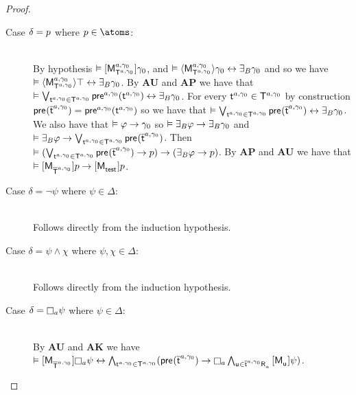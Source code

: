 \begin{proof}
\begin{enumerate}
        \begin{description}
            \item[Case $\delta = \atomP$ where $\atomP \in \atoms$:] \hfill\\
                By hypothesis $\entails \actionA{\aPModel[\agentA, \gamma_0]{\aStatesT[\agentA, \gamma_0]}} \gamma_0$, and $\entails \actionE{\aPModel[\agentA, \gamma_0]{\aStatesT[\agentA, \gamma_0]}} \gamma_0 \iff \someactsBs \gamma_0$ and so we have $\entails \actionE{\aPModel[\agentA, \gamma_0]{\aStatesT[\agentA, \gamma_0]}} \top \iff \someactsBs \gamma_0$.
                By {\bf AU} and {\bf AP} we have that $\entails \bigvee_{\aStateT[\agentA, \gamma_0] \in \aStatesT[\agentA, \gamma_0]} \aPrecondition[\agentA, \gamma_0](\aStateT[\agentA, \gamma_0]) \iff \someactsBs \gamma_0$.
                For every $\aStateT[\agentA, \gamma_0] \in \aStatesT[\agentA, \gamma_0]$ by construction $\aPrecondition(\aPStateT[\agentA, \gamma_0]) = \aPrecondition[\agentA, \gamma_0](\aStateT[\agentA, \gamma_0])$ so we have that $\entails \bigvee_{\aStateT[\agentA, \gamma_0] \in \aStatesT[\agentA, \gamma_0]} \aPrecondition(\aPStateT[\agentA, \gamma_0]) \iff \someactsBs \gamma_0$.
                We also have that $\entails \phi \implies \gamma_0$ so $\entails \someactsBs \phi \implies \someactsBs \gamma_0$ and $\entails \someactsBs \phi \implies \bigvee_{\aStateT[\agentA, \gamma_0] \in \aStatesT[\agentA, \gamma_0]} \aPrecondition(\aPStateT[\agentA, \gamma_0])$.
                Then $\entails (\bigvee_{\aStateT[\agentA, \gamma_0] \in \aStatesT[\agentA, \gamma_0]} \aPrecondition(\aPStateT[\agentA, \gamma_0]) \implies \atomP) \implies (\someactsBs \phi \implies \atomP)$.
                By {\bf AP} and {\bf AU} we have that $\entails \actionA{\aPModel{\aPStatesT[\agentA, \gamma_0]}} \atomP \implies \actionA{\aPModel{\aStateTest}} \atomP $.
            \item[Case $\delta = \lnot \psi$ where $\psi \in \Delta$:] \hfill\\
                Follows directly from the induction hypothesis.
            \item[Case $\delta = \psi \land \chi$ where $\psi, \chi \in \Delta$:] \hfill\\
                Follows directly from the induction hypothesis.
            \item[Case $\delta = \necessaryA \psi$ where $\psi \in \Delta$:] \hfill\\
                By {\bf AU} and {\bf AK} we have $\entails \actionA{\aPModel{\aPStatesT[\agentA, \gamma_0]}} \necessaryA \psi \iff \bigwedge_{\aStateT[\agentA, \gamma_0] \in \aStatesT[\agentA, \gamma_0]} (\aPrecondition(\aPStateT[\agentA, \gamma_0]) \implies \necessaryA \bigwedge_{\aStateU \in \aSuccessorsA{\aPStateT[\agentA, \gamma_0]}} \actionA{\aPModel{\aStateU}} \psi)$.

\end{description}
\end{enumerate}
\end{proof}
